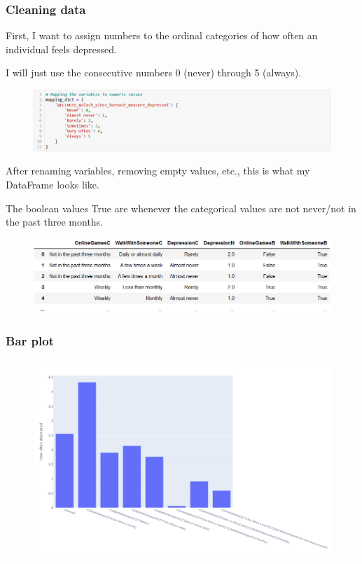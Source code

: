 \documentclass{beamer}
\begin{document}
\begin{frame}
    \frametitle{Cleaning data}

    First, I want to assign numbers to the ordinal categories of how often an individual feels depressed.

    I will just use the consecutive numbers 0 (never) through 5 (always).

    \begin{figure}
        \centering
        \includegraphics[width=0.8\linewidth]{jason_depressionvalues.png}
    \end{figure}

    After renaming variables, removing empty values, etc., this is what my DataFrame looks like.

    {\tiny The boolean values True are whenever the categorical values are not never/not in the past three months.}

    \begin{figure}
        \centering
        \includegraphics[width=0.7\linewidth]{jason_dfpreview.png}
    \end{figure}
    
\end{frame}

\begin{frame}
    \frametitle{Bar plot}

    \begin{figure}
        \centering
        \includegraphics[width=1\linewidth]{jason_barplot.png}
    \end{figure}

\end{frame}
\end{document}
